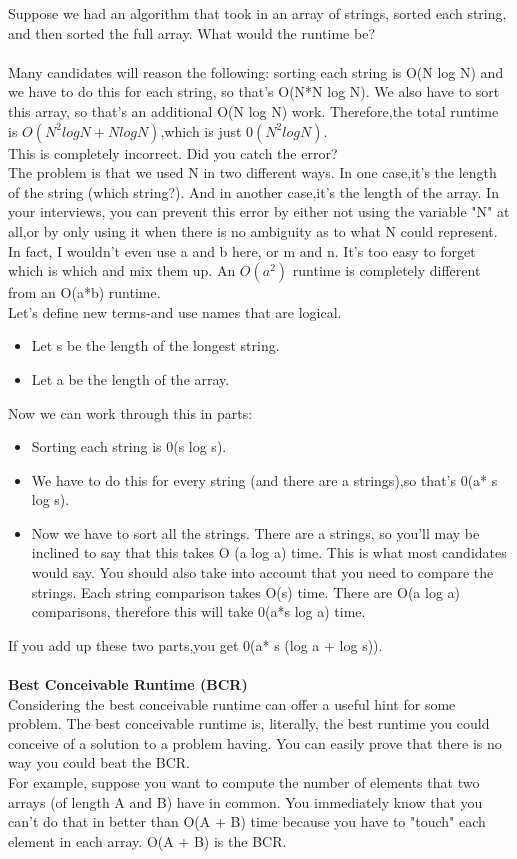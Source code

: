 \documentclass[14pt, noindent]{article}
\begin{document}
\vspace{20pt}
Suppose we had an algorithm that took in an array of strings, sorted each string, and then sorted
the full array. What would the runtime be? \\\\
Many candidates will reason the following: sorting each string is O(N log N) and we have to do this for
each string, so that's O(N*N log N). We also have to sort this array, so that's an additional
O(N log N) work. Therefore,the total runtime is $O(N^2 log N + N log N)$,which is just $0(N^2 log N)$.\\
This is completely incorrect. Did you catch the error?\\
The problem is that we used N in two different ways. In one case,it's the length of the string
(which string?). And in another case,it's the length of the array. In your interviews, you can prevent
this error by either not using the variable "N" at all,or by only using it when there is no ambiguity
as to what N could represent. In fact, I wouldn't even use a and b here, or m and n. It's too easy to
forget which is which and mix them up. An $O(a^2)$ runtime is completely different from an O(a*b) runtime.\\
Let's define new terms-and use names that are logical.\\
\begin{itemize}
\item Let s be the length of the longest string.
\item Let a be the length of the array.
\end{itemize}
Now we can work through this in parts:
\begin{itemize}
\item Sorting each string is 0(s log s).
\item We have to do this for every string (and there are a strings),so that's 0(a* s log s).
\item Now we have to sort all the strings. There are a strings, so you'll may be inclined to say
that this takes O (a log a) time. This is what most candidates would say. You should also take into
account that you need to compare the strings. Each string comparison takes O(s) time. There are
O(a log a) comparisons, therefore this will take 0(a*s log a) time.
\end{itemize}
If you add up these two parts,you get 0(a* s (log a + log s)).\\\\

\textbf{Best Conceivable Runtime (BCR)\\}
Considering the best conceivable runtime can offer a useful hint for some problem. The best
conceivable runtime is, literally, the best runtime you could conceive of a solution to 
a problem having. You can easily prove that there is no way you could beat the BCR.\\
For example, suppose you want to compute the number of elements that two arrays 
(of length A and B) have in common. You immediately know that you can't do that in better 
than O(A + B) time because you have to "touch" each element in each array. O(A + B) is the BCR.
\end{document}
